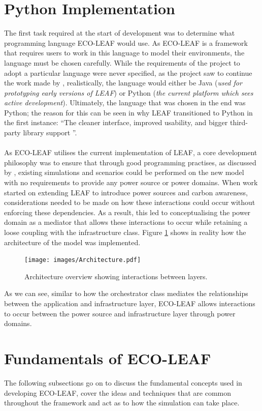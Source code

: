 \documentclass{l4proj}
\begin{document}
\section{Python Implementation}\label{sec:python}
The first task required at the start of development was to determine what programming language ECO-LEAF would use.
As ECO-LEAF is a framework that requires users to work in this language to model their environments, the language must be chosen carefully.
While the requirements of the project to adopt a particular language were never specified, as the project saw to continue the work made by \cite{leaf2021}, realistically, the language would either be Java (\textit{used for prototyping early versions of LEAF}) or Python (\textit{the current platform which sees active development}).
Ultimately, the language that was chosen in the end was Python; the reason for this can be seen in why LEAF transitioned to Python in the first instance: ``The cleaner interface, improved usability, and bigger third-party library support \citep{leaf-java-git}''.\\ \\
As ECO-LEAF utilises the current implementation of LEAF, a core development philosophy was to ensure that through good programming practises, as discussed by \citep{looseCoupling}, existing simulations and scenarios could be performed on the new model with no requirements to provide any power source or power domains.
When work started on extending LEAF to introduce power sources and carbon awareness, considerations needed to be made on how these interactions could occur without enforcing these dependencies.
As a result, this led to conceptualising the power domain as a mediator that allows these interactions to occur while retaining a loose coupling with the infrastructure class.
Figure \ref{fig:archtecture} shows in reality how the architecture of the model was implemented.

\begin{figure}[h]
    \centering
    \texttt{[image: images/Architecture.pdf]}
    ~
    \caption{Architecture overview showing interactions between layers.}
    \label{fig:archtecture}
\end{figure}

As we can see, similar to how the orchestrator class mediates the relationships between the application and infrastructure layer, ECO-LEAF allows interactions to occur between the power source and infrastructure layer through power domains.

\section{Fundamentals of ECO-LEAF}
The following subsections go on to discuss the fundamental concepts used in developing ECO-LEAF, cover the ideas and techniques that are common throughout the framework and act as to how the simulation can take place.
\end{document}
